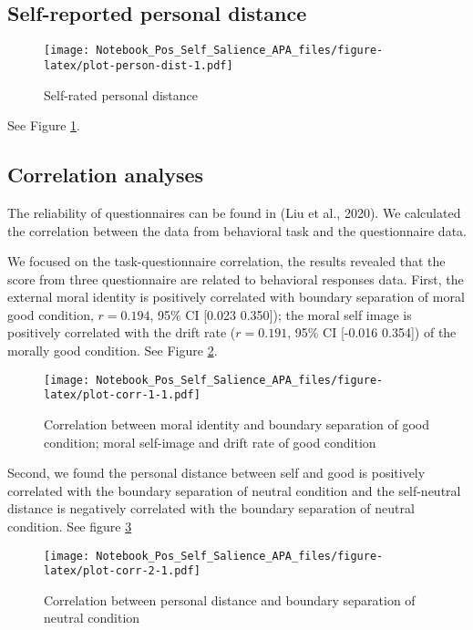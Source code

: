 \documentclass[
  english,
  man]{apa6}
\begin{document}
\hypertarget{self-reported-personal-distance}{%
\subsection{Self-reported personal distance}\label{self-reported-personal-distance}}

\begin{figure}
\centering
\texttt{[image: Notebook\_Pos\_Self\_Salience\_APA\_files/figure-latex/plot-person-dist-1.pdf]}
\caption{\label{fig:plot-person-dist}Self-rated personal distance}
\end{figure}

See Figure \ref{fig:plot-person-dist}.

\hypertarget{correlation-analyses}{%
\subsection{Correlation analyses}\label{correlation-analyses}}

The reliability of questionnaires can be found in (Liu et al., 2020). We calculated the correlation between the data from behavioral task and the questionnaire data.

We focused on the task-questionnaire correlation, the results revealed that the score from three questionnaire are related to behavioral responses data.
First, the external moral identity is positively correlated with boundary separation of moral good condition, \(r = 0.194\), 95\% CI {[}0.023 0.350{]}); the moral self image is positively correlated with the drift rate (\(r = 0.191\), 95\% CI {[}-0.016 0.354{]}) of the morally good condition. See Figure \ref{fig:plot-corr-1}.

\begin{figure}
\centering
\texttt{[image: Notebook\_Pos\_Self\_Salience\_APA\_files/figure-latex/plot-corr-1-1.pdf]}
\caption{\label{fig:plot-corr-1}Correlation between moral identity and boundary separation of good condition; moral self-image and drift rate of good condition}
\end{figure}

Second, we found the personal distance between self and good is positively correlated with the boundary separation of neutral condition and the self-neutral distance is negatively correlated with the boundary separation of neutral condition. See figure \ref{fig:plot-corr-2}

\begin{figure}
\centering
\texttt{[image: Notebook\_Pos\_Self\_Salience\_APA\_files/figure-latex/plot-corr-2-1.pdf]}
\caption{\label{fig:plot-corr-2}Correlation between personal distance and boundary separation of neutral condition}
\end{figure}
\end{document}
